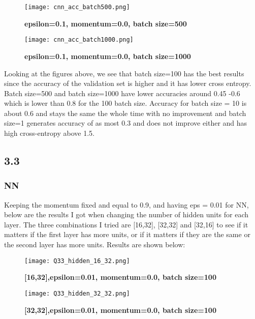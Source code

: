 \documentclass[10pt]{article}
\begin{document}
\begin{figure}[H]
	\centering
	\texttt{[image: cnn\_acc\_batch500.png]}
	\caption{\textbf{epsilon=0.1, momentum=0.0, batch size=500}}
	\label{fig:}
\end{figure}


\begin{figure}[H]
	\centering
	\texttt{[image: cnn\_acc\_batch1000.png]}
	\caption{\textbf{epsilon=0.1, momentum=0.0, batch size=1000}}
	\label{fig:}
\end{figure}

Looking at the figures above, we see that batch size=100 has the best results since the accuracy of the validation set is higher and it has lower cross entropy. Batch size=500 and batch size=1000 have lower accuracies around 0.45 -0.6 which is lower than 0.8 for the 100 batch size. Accuracy for batch size = 10 is about 0.6 and stays the same the whole time with no improvement and batch size=1 generates accuracy of as most 0.3 and does not improve either and has high cross-entropy above 1.5.




\subsection*{3.3}
\subsubsection*{NN}
Keeping the momentum fixed and equal to 0.9, and having eps = 0.01 for NN, below are the results I got when changing the number of hidden units for each layer. The three combinations I tried are [16,32], [32,32] and [32,16] to see if it matters if the first layer has more units, or if it matters if they are the same or the second layer has more units. Results are shown below:

\begin{figure}[H]
	\centering
	\texttt{[image: Q33\_hidden\_16\_32.png]}
	\caption{\textbf{[16,32],epsilon=0.01, momentum=0.0, batch size=100}}
	\label{fig:}
\end{figure}


\begin{figure}[H]
	\centering
	\texttt{[image: Q33\_hidden\_32\_32.png]}
	\caption{\textbf{[32,32],epsilon=0.01, momentum=0.0, batch size=100}}
	\label{fig:}
\end{figure}
\end{document}

